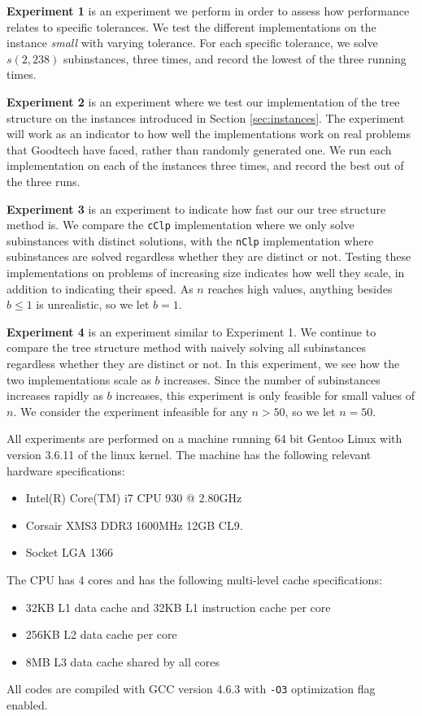 \textbf{Experiment 1} is an experiment we perform in order to assess
how performance relates to specific tolerances. We test the different
implementations on the instance \textit{small} with varying tolerance.
For each specific tolerance, we solve $s(2, 238)$ subinstances, three times,
and record the lowest of the three running times.

\textbf{Experiment 2} is an experiment where we test our implementation of the
tree structure on the instances introduced in Section \ref{sec:instances}.
The experiment will work as an indicator to how well the implementations work
on real problems that Goodtech have faced, rather than randomly generated one.
We run each implementation on each of the instances three times, and record
the best out of the three runs.

\textbf{Experiment 3} is an experiment to indicate how fast our
our tree structure method is. We compare the
\texttt{cClp} implementation where we only solve subinstances
with distinct solutions, with the \texttt{nClp} implementation where
subinstances are solved regardless whether they are distinct or not.
Testing these implementations on problems of increasing size indicates how well
they scale, in addition to indicating their speed. 
As $n$ reaches high values, anything besides $b \leq 1$ is unrealistic, so we
let $b = 1$.

\textbf{Experiment 4} is an experiment similar to Experiment 1. We continue
to compare the tree structure method with naively solving all
subinstances regardless whether they are distinct or not. In this experiment, we
see how the two implementations scale as $b$ increases. Since the number
of subinstances increases rapidly as $b$ increases, this experiment is only
feasible for small values of $n$. We consider the experiment infeasible for
any $n > 50$, so we let $n = 50$.

All experiments are performed on a machine running 64 bit Gentoo Linux
with version 3.6.11 of the linux kernel. The machine has the following
relevant hardware specifications:
\begin{itemize}
    \item Intel(R) Core(TM) i7 CPU 930 @ 2.80GHz
    \item Corsair XMS3 DDR3 1600MHz 12GB CL9.
    \item Socket LGA 1366
\end{itemize}
The CPU has 4 cores and has the following multi-level cache specifications:
~\cite{intel}
\begin{itemize}
    \item 32KB L1 data cache and 32KB L1 instruction cache per core
    \item 256KB L2 data cache per core
    \item 8MB L3 data cache shared by all cores
\end{itemize}

All codes are compiled with GCC version 4.6.3 with \texttt{-O3}
optimization flag enabled.

